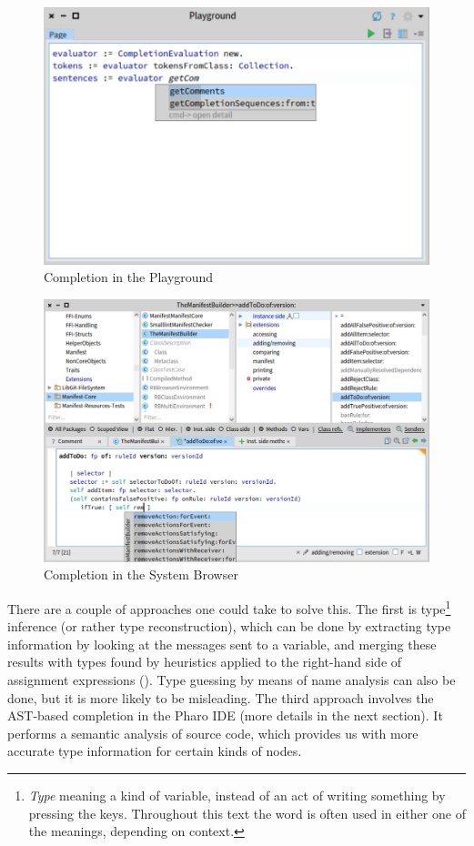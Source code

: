 \begin{figure}[H]
    \centering
    \includegraphics[width=0.9\linewidth]{images/completion1.png}
    \caption{Completion in the Playground}
    \label{fig:playground}
\end{figure}

\begin{figure}[H]
    \centering
    \includegraphics[width=0.9\linewidth]{images/completion2.png}
    \caption{Completion in the System Browser}
    \label{fig:editor}
\end{figure}

There are a couple of approaches one could take to solve this. The first is type\footnote{\textit{Type} meaning a kind of variable, instead of an act of writing something by pressing the keys. Throughout this text the word is often used in either one of the meanings, depending on context.} inference (or rather type reconstruction), which can be done by extracting type information by looking at the messages sent to a variable, and merging these results with types found by heuristics applied to the right-hand side of assignment expressions (\cite{Pluq09a}). Type guessing by means of name analysis can also be done, but it is more likely to be misleading. The third approach involves the AST-based completion in the Pharo IDE (more details in the next section). It performs a semantic analysis of source code, which provides us with more accurate type information for certain kinds of nodes.


